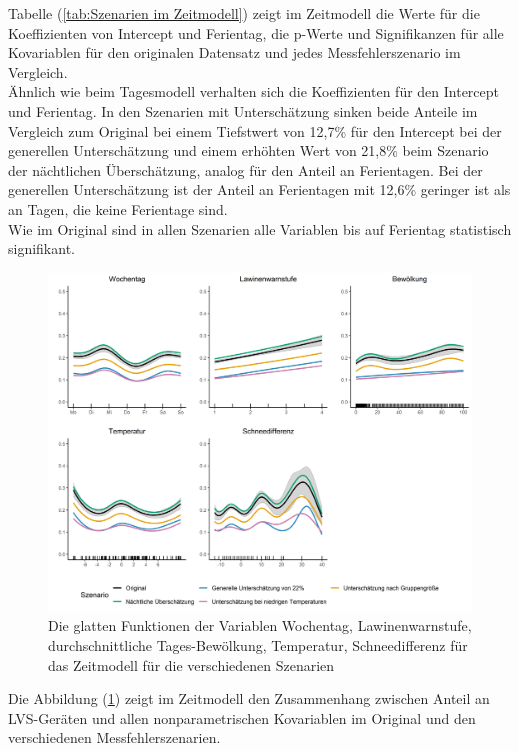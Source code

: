 \documentclass[12pt]{scrreprt}
\begin{document}
\noindent Tabelle (\ref{tab:Szenarien im Zeitmodell}) zeigt im Zeitmodell die Werte für die Koeffizienten von Intercept und Ferientag, die p-Werte und Signifikanzen für alle Kovariablen für den originalen Datensatz und jedes Messfehlerszenario im Vergleich. \\
Ähnlich wie beim Tagesmodell verhalten sich die Koeffizienten für den Intercept und Ferientag. In den Szenarien mit Unterschätzung sinken beide Anteile im Vergleich zum Original bei einem Tiefstwert von 12,7\% für den Intercept bei der generellen Unterschätzung und einem erhöhten Wert von 21,8\% beim Szenario der nächtlichen Überschätzung, analog für den Anteil an Ferientagen. Bei der generellen Unterschätzung ist der Anteil an Ferientagen mit 12,6\% geringer ist als an Tagen, die keine Ferientage sind. \\
Wie im Original sind in allen Szenarien alle Variablen bis auf Ferientag statistisch signifikant. \\
\begin{figure}[H]
	\centering
	\includegraphics[width=\linewidth]{plots/time_model_comparison}
	\caption{ Die glatten Funktionen der Variablen Wochentag, Lawinenwarnstufe, durchschnittliche Tages-Bewölkung, Temperatur, Schneedifferenz für das Zeitmodell für die verschiedenen Szenarien}
	\label{pic:time_model_comparison}	
\end{figure}
\noindent Die Abbildung (\ref{pic:time_model_comparison}) zeigt im Zeitmodell den Zusammenhang zwischen Anteil an LVS-Geräten und allen nonparametrischen Kovariablen im Original und den verschiedenen Messfehlerszenarien. \\
\end{document}
